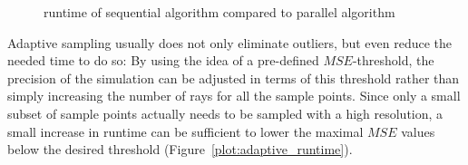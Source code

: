 \begin{figure}[H]
  \centerline{
  }
  \caption{runtime of sequential algorithm compared to parallel algorithm}
\label{plot:runtime}
\end{figure}
Adaptive sampling usually does not only eliminate outliers, but even reduce the
needed time to do so: By using the idea of a pre-defined $MSE$-threshold, the
precision of the simulation can be adjusted in terms of this threshold rather than
simply increasing the number of rays for all the sample points. Since only a
small subset of sample points actually needs to be sampled with a high
resolution, a small increase in runtime can be sufficient to lower the maximal
$MSE$ values below the desired threshold (Figure~\ref{plot:adaptive_runtime}).
